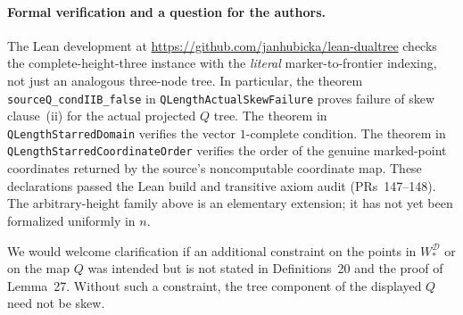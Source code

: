\documentclass[11pt,a4paper]{article}
\begin{document}
\paragraph{Formal verification and a question for the authors.}
The Lean development at
\url{https://github.com/janhubicka/lean-dualtree}
checks the complete-height-three instance with the \emph{literal}
marker-to-frontier indexing, not just an analogous three-node tree.
In particular, the theorem
\texttt{sourceQ\_condIIB\_false} in
\texttt{QLengthActualSkewFailure}
proves failure of skew clause~(ii) for the actual projected $Q$ tree.
The theorem 
in \texttt{QLengthStarredDomain} verifies the vector $1$-complete
condition. The theorem 
in \texttt{QLengthStarredCoordinateOrder} verifies the order of the
genuine marked-point coordinates returned by the source's
noncomputable coordinate map. These declarations passed
the Lean build and transitive axiom audit (PRs~147--148).
The arbitrary-height family above is an elementary extension;
it has not yet been formalized uniformly in $n$.

We would welcome clarification if an additional constraint on the
points in $W^{\mathcal D}_*$ or on the map $Q$ was intended but is not
stated in Definitions~20 and the proof of Lemma~27. Without such a
constraint, the tree component of the displayed $Q$ need not be skew.
\end{document}
